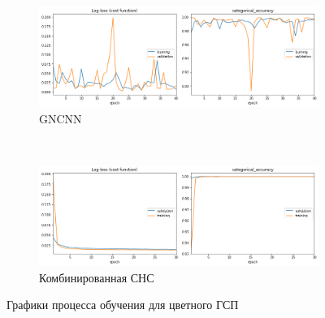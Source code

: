 \begin{figure}[p]
    \centering

    \begin{subfigure}{\textwidth}
        \includegraphics[width=\textwidth]{include/graphics/experimental_plots/color/gncnn_hic}
                            \caption{GNCNN}
    \end{subfigure}
    ~
    \begin{subfigure}{\textwidth}
        \includegraphics[width=\textwidth]{include/graphics/experimental_plots/color/mixed_hic}
                    \caption{Комбинированная СНС}
    \end{subfigure}

    \caption{Графики процесса обучения для цветного ГСП}
    \label{fig:ColorPlotsHIC}
\end{figure}

